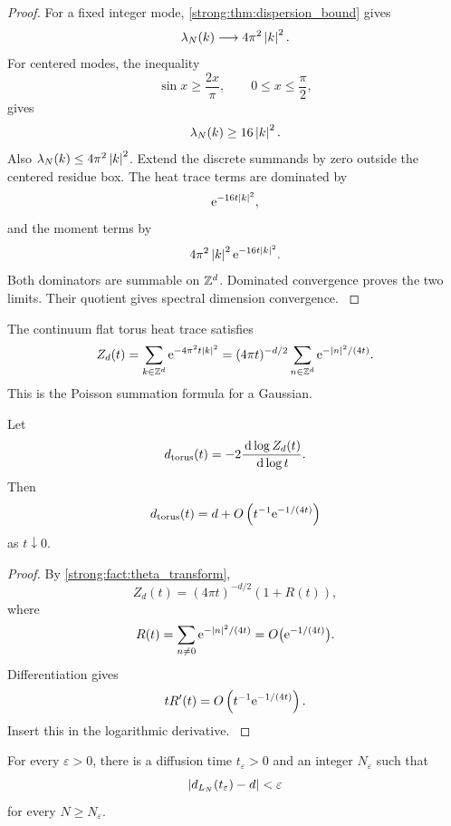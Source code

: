 \begin{proof}\label{strong:proof:065}
For a fixed integer mode, \cref{strong:thm:dispersion_bound} gives
\[
\lambda_N(k)\longrightarrow4\pi^2\left\lvert k\right\rvert^2.
\]
For centered modes, the inequality
\[
\sin x\geq\frac{2x}{\pi},
\qquad
0\leq x\leq\frac\pi2,
\]
gives
\[
\lambda_N(k)\geq16\left\lvert k\right\rvert^2.
\]
Also \(\lambda_N(k)\leq4\pi^2\left\lvert k\right\rvert^2\). Extend the discrete summands by zero outside the centered residue box. The heat trace terms are dominated by
\[
\mathrm e^{-16t\left\lvert k\right\rvert^2},
\]
and the moment terms by
\[
4\pi^2\left\lvert k\right\rvert^2\mathrm e^{-16t\left\lvert k\right\rvert^2}.
\]
Both dominators are summable on \(\mathbb Z^d\). Dominated convergence proves the two limits. Their quotient gives spectral dimension convergence.
\label{strong:proof:065:end}\end{proof}

\begin{standardfact}\label{strong:standardfact:004}\label{strong:fact:theta_transform}
The continuum flat torus heat trace satisfies
\[
Z_d(t)
=
\sum_{k\in\mathbb Z^d}\mathrm e^{-4\pi^2t\left\lvert k\right\rvert^2}
=
(4\pi t)^{-d/2}
\sum_{n\in\mathbb Z^d}\mathrm e^{-\left\lvert n\right\rvert^2/(4t)}.
\]
This is the Poisson summation formula for a Gaussian.
\end{standardfact}

\begin{theorem}\label{strong:theorem:041}\label{strong:thm:continuum_dimension}
Let
\[
d_{\rm torus}(t)
=-2\frac{\,\mathrm d\log Z_d(t)}{\,\mathrm d\log t}.
\]
Then
\[
d_{\rm torus}(t)
=
 d+O\left(t^{-1}\mathrm e^{-1/(4t)}\right)
\]
as \(t\downarrow0\).
\end{theorem}

\begin{proof}\label{strong:proof:066}
By \cref{strong:fact:theta_transform},
\[
Z_d(t)
=(4\pi t)^{-d/2}(1+R(t)),
\]
where
\[
R(t)=\sum_{n\neq0}\mathrm e^{-\left\lvert n\right\rvert^2/(4t)}
=O\bigl(\mathrm e^{-1/(4t)}\bigr).
\]
Differentiation gives
\[
tR'(t)=O\left(t^{-1}\mathrm e^{-1/(4t)}\right).
\]
Insert this in the logarithmic derivative.
\label{strong:proof:066:end}\end{proof}

\begin{corollary}\label{strong:corollary:015}\label{strong:cor:dimension_window}
For every \(\varepsilon>0\), there is a diffusion time \(t_\varepsilon>0\) and an integer \(N_\varepsilon\) such that
\[
\left\lvert d_{L_N}(t_\varepsilon)-d\right\rvert<\varepsilon
\]
for every \(N\geq N_\varepsilon\).
\end{corollary}

